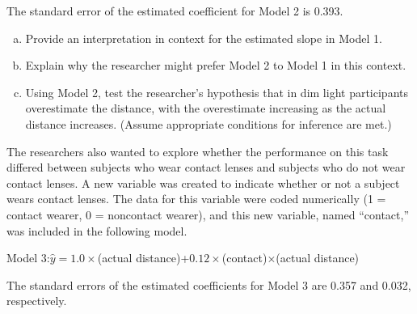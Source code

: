 \documentclass[a4paper,12pt,twoside]{book}
\begin{document}
\begin{enumerate}
The standard error of the estimated coefficient for Model 2 is 0.393.
  
  \begin{enumerate}[(a), start = 1]
  \item  Provide an interpretation in context for the estimated slope in Model 1.
  \item Explain why the researcher might prefer Model 2 to Model 1 in this context.
  \item Using Model 2, test the researcher’s hypothesis that in dim light participants overestimate the distance, with the overestimate increasing as the actual distance increases. (Assume appropriate conditions for inference are met.)
  \end{enumerate}
  
The researchers also wanted to explore whether the performance on this task differed between subjects who wear contact lenses and subjects who do not wear contact lenses. A new variable was created to indicate whether or not a subject wears contact lenses. The data for this variable were coded numerically (1 = contact wearer, 0 = noncontact wearer), and this new variable, named “contact,” was included in the following model.\\

\begin{center}
Model 3:$\hat{y}=1.0\times$(actual distance)+$0.12\times$(contact)$\times$(actual distance) 
\end{center}
The standard errors of the estimated coefficients for Model 3 are 0.357 and 0.032, respectively.
  

\end{enumerate}
\end{document}
